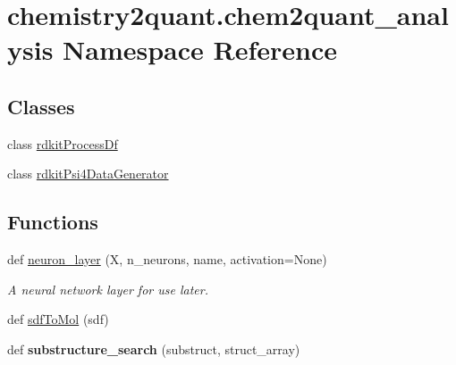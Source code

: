 \hypertarget{namespacechemistry2quant_1_1chem2quant__analysis}{}\section{chemistry2quant.\+chem2quant\+\_\+analysis Namespace Reference}
\label{namespacechemistry2quant_1_1chem2quant__analysis}
\subsection*{Classes}
\begin{DoxyCompactItemize}
\item 
class \hyperlink{classchemistry2quant_1_1chem2quant__analysis_1_1rdkitProcessDf}{rdkit\+Process\+Df}
\item 
class \hyperlink{classchemistry2quant_1_1chem2quant__analysis_1_1rdkitPsi4DataGenerator}{rdkit\+Psi4\+Data\+Generator}
\end{DoxyCompactItemize}
\subsection*{Functions}
\begin{DoxyCompactItemize}
\item 
\mbox{\label{namespacechemistry2quant_1_1chem2quant__analysis_af45b049d6a04c87f9f473f3356dda58c}} 
def \hyperlink{namespacechemistry2quant_1_1chem2quant__analysis_af45b049d6a04c87f9f473f3356dda58c}{neuron\+\_\+layer} (X, n\+\_\+neurons, name, activation=None)
\begin{DoxyCompactList}\small\item\em A neural network layer for use later. \end{DoxyCompactList}\item 
def \hyperlink{namespacechemistry2quant_1_1chem2quant__analysis_a5c890927e4c20980765efaff0db0c04a}{sdf\+To\+Mol} (sdf)
\item 
\mbox{\label{namespacechemistry2quant_1_1chem2quant__analysis_a2707785b7dfd340c999a995b73c2b198}} 
def {\bfseries substructure\+\_\+search} (substruct, struct\+\_\+array)
\end{DoxyCompactItemize}
